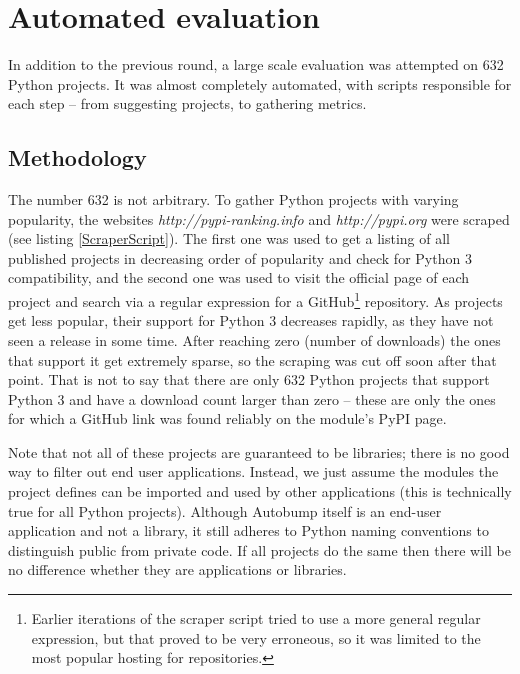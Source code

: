 \documentclass{l4proj}
\begin{document}

\section{Automated evaluation}

In addition to the previous round, a large scale evaluation was
attempted on 632 Python projects. It was almost completely automated,
with scripts responsible for each step -- from suggesting projects, to
gathering metrics.

\subsection{Methodology}

The number 632 is not arbitrary. To gather Python projects with
varying popularity, the websites \textit{http://pypi-ranking.info} and
\textit{http://pypi.org} were scraped (see listing
\ref{ScraperScript}). The first one was used to get a listing of all
published projects in decreasing order of popularity and check for
Python 3 compatibility, and the second one was used to visit the
official page of each project and search via a regular expression for
a GitHub\footnote{Earlier iterations of the scraper script tried to
use a more general regular expression, but that proved to be very
erroneous, so it was limited to the most popular hosting for
repositories.} repository. As projects get less popular, their support
for Python 3 decreases rapidly, as they have not seen a release in
some time. After reaching zero (number of downloads) the ones that
support it get extremely sparse, so the scraping was cut off soon
after that point. That is not to say that there are only 632 Python
projects that support Python 3 and have a download count larger than
zero -- these are only the ones for which a GitHub link was found
reliably on the module's PyPI page.

Note that not all of these projects are guaranteed to be libraries;
there is no good way to filter out end user applications. Instead, we
just assume the modules the project defines can be imported and used
by other applications (this is technically true for all Python
projects). Although Autobump itself is an end-user application and not
a library, it still adheres to Python naming conventions to
distinguish public from private code. If all projects do the same then
there will be no difference whether they are applications or
libraries.
\end{document}
